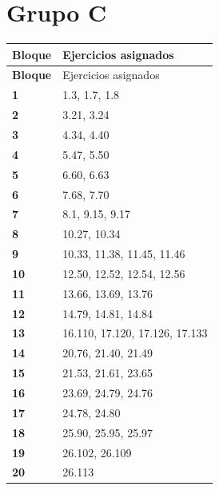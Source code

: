 \documentclass[11pt,letterpaper]{article}
\begin{document}
\section*{Grupo C}
\small
\begin{longtable}{>{\bfseries}p{2cm}p{13.5cm}}
\toprule Bloque & Ejercicios asignados \\ \midrule
\endfirsthead
\toprule Bloque & Ejercicios asignados \\ \midrule
\endhead
1 & 1.3, 1.7, 1.8 \\
2 & 3.21, 3.24 \\
3 & 4.34, 4.40 \\
4 & 5.47, 5.50 \\
5 & 6.60, 6.63 \\
6 & 7.68, 7.70 \\
7 & 8.1, 9.15, 9.17 \\
8 & 10.27, 10.34 \\
9 & 10.33, 11.38, 11.45, 11.46 \\
10 & 12.50, 12.52, 12.54, 12.56 \\
11 & 13.66, 13.69, 13.76 \\
12 & 14.79, 14.81, 14.84 \\
13 & 16.110, 17.120, 17.126, 17.133 \\
14 & 20.76, 21.40, 21.49 \\
15 & 21.53, 21.61, 23.65 \\
16 & 23.69, 24.79, 24.76 \\
17 & 24.78, 24.80 \\
18 & 25.90, 25.95, 25.97 \\
19 & 26.102, 26.109 \\
20 & 26.113 \\
\bottomrule
\end{longtable}
\normalsize
\clearpage
\end{document}
